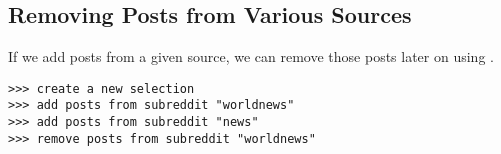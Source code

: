 \subsection{Removing Posts from Various Sources}

If we add posts from a given source, we can remove those posts later on using .
\newline\begin{minipage}{\linewidth}\begin{lstlisting}
>>> create a new selection
>>> add posts from subreddit "worldnews"
>>> add posts from subreddit "news"
>>> remove posts from subreddit "worldnews"
\end{lstlisting}\end{minipage}
